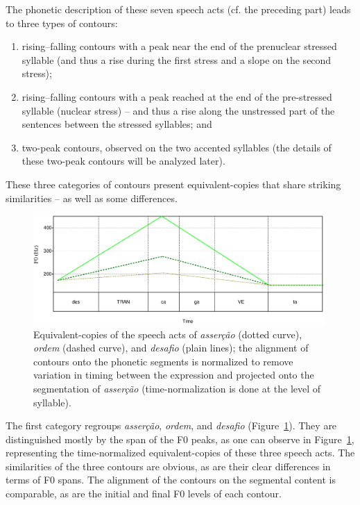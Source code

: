 \documentclass[output=paper]{LSP/langsci}
\begin{document}
The phonetic description of these seven speech acts (cf. the preceding part) leads to three types of contours: 
\begin{enumerate}
\item rising–falling contours with a peak near the end of the prenuclear stressed syllable (and thus a rise during the first stress and a slope on the second stress); 
\item rising–falling contours with a peak reached at the end of the pre-stressed syllable (nuclear stress) -- and thus a rise along the unstressed part of the sentences between the stressed syllables; and 
\item two-peak contours, observed on the two accented syllables (the details of these two-peak contours will be analyzed later).
\end{enumerate}

These three categories of contours present equivalent-copies that share striking similarities -- as well as some differences.


\begin{figure}[t]
\includegraphics[width=0.99\textwidth]{figures/MOR10.eps}
\caption{Equivalent-copies of the speech acts of \textit{asserção} (dotted curve), \textit{ordem} (dashed curve), and \textit{desafio} (plain lines); the alignment of contours onto the phonetic segments is normalized to remove variation in timing between the expression and projected onto the segmentation of \textit{asserção} (time-normalization is done at the level of syllable).}
\label{figure:EC1}
\end{figure}

The first category regroups \textit{asserção}, \textit{ordem}, and \textit{desafio} (Figure~\ref{figure:EC1}). 
They are distinguished mostly by the span of the F0 peaks, as one can observe in Figure~\ref{figure:EC1}, representing the time-normalized equivalent-copies of these three speech acts. 
The similarities of the three contours are obvious, as are their clear differences in terms of F0 spans. 
The alignment of the contours on the segmental content is comparable, as are the initial and final F0 levels of each contour.
\end{document}
